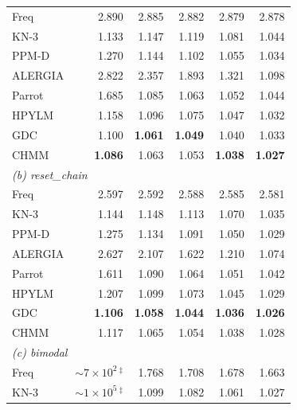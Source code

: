 \begin{table}[t]
\begin{tabular}{l r r r r r}
Freq    & 2.890          & 2.885          & 2.882          & 2.879          & 2.878          \\
KN-3    & 1.133          & 1.147          & 1.119          & 1.081          & 1.044          \\
PPM-D   & 1.270          & 1.144          & 1.102          & 1.055          & 1.034          \\
ALERGIA & 2.822          & 2.357          & 1.893          & 1.321          & 1.098          \\
Parrot  & 1.685          & 1.085          & 1.063          & 1.052          & 1.044          \\
HPYLM   & 1.158          & 1.096          & 1.075          & 1.047          & 1.032          \\
GDC     & 1.100          & \textbf{1.061} & \textbf{1.049} & 1.040          & 1.033          \\
CHMM    & \textbf{1.086} & 1.063          & 1.053          & \textbf{1.038} & \textbf{1.027} \\
\midrule
\multicolumn{6}{l}{\emph{(b) reset\_chain}} \\
Freq    & 2.597          & 2.592          & 2.588          & 2.585          & 2.581          \\
KN-3    & 1.144          & 1.148          & 1.113          & 1.070          & 1.035          \\
PPM-D   & 1.275          & 1.134          & 1.091          & 1.050          & 1.029          \\
ALERGIA & 2.627          & 2.107          & 1.622          & 1.210          & 1.074          \\
Parrot  & 1.611          & 1.090          & 1.064          & 1.051          & 1.042          \\
HPYLM   & 1.207          & 1.099          & 1.073          & 1.045          & 1.029          \\
GDC     & \textbf{1.106} & \textbf{1.058} & \textbf{1.044} & \textbf{1.036} & \textbf{1.026} \\
CHMM    & 1.117          & 1.065          & 1.054          & 1.038          & 1.028          \\
\midrule
\multicolumn{6}{l}{\emph{(c) bimodal}} \\
Freq    & $\sim7{\times}10^{2}$\,$^\ddagger$ & 1.768          & 1.708          & 1.678          & 1.663          \\
KN-3    & $\sim1{\times}10^{5}$\,$^\ddagger$ & 1.099          & 1.082          & 1.061          & 1.027          \\

\end{tabular}
\end{table}
